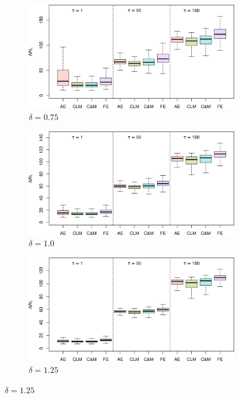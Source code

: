 \begin{figure}
\begin{subfigure}{0.49\textwidth}
\end{subfigure}
\begin{subfigure}{0.49\textwidth}
  \centering
  \caption{$ \delta = 0.75$}
  \label{fig:lambda=0.075/theta=4.0/delta=0.75}
  \includegraphics[width=\textwidth]{img/sims/theta=4.0_signedEWMA(l = 0.075, upw = true, L = 1.0)/delta=0.75.png}
\end{subfigure}
\begin{subfigure}{0.49\textwidth}
  \centering
  \caption{$ \delta = 1.0$}
  \label{fig:lambda=0.075/theta=4.0/delta=1.0}
  \includegraphics[width=\textwidth]{img/sims/theta=4.0_signedEWMA(l = 0.075, upw = true, L = 1.0)/delta=1.00.png}
\end{subfigure}
\begin{subfigure}{0.49\textwidth}
  \centering
  \caption{$ \delta = 1.25$}
  \label{fig:lambda=0.075/theta=4.0/delta=1.25}
  \includegraphics[width=\textwidth]{img/sims/theta=4.0_signedEWMA(l = 0.075, upw = true, L = 1.0)/delta=1.25.png}

\end{subfigure}
\end{figure}
